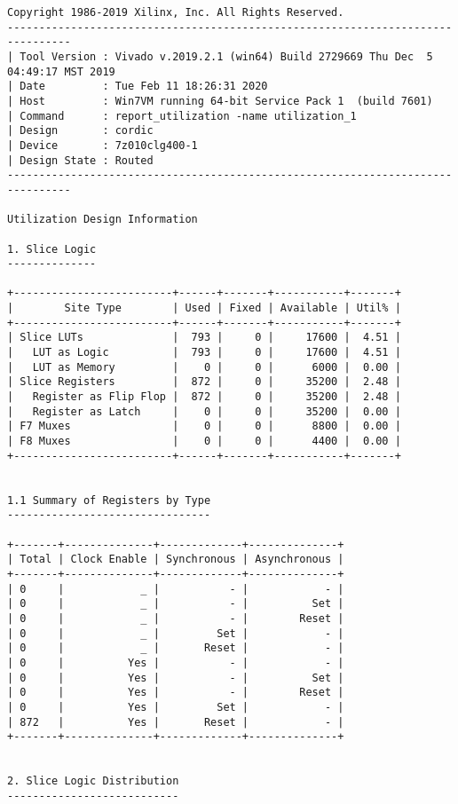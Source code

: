 \begin{Verbatim}[fontsize=\footnotesize,xleftmargin=-1cm]
Copyright 1986-2019 Xilinx, Inc. All Rights Reserved.
--------------------------------------------------------------------------------
| Tool Version : Vivado v.2019.2.1 (win64) Build 2729669 Thu Dec  5 04:49:17 MST 2019
| Date         : Tue Feb 11 18:26:31 2020
| Host         : Win7VM running 64-bit Service Pack 1  (build 7601)
| Command      : report_utilization -name utilization_1
| Design       : cordic
| Device       : 7z010clg400-1
| Design State : Routed
--------------------------------------------------------------------------------

Utilization Design Information

1. Slice Logic
--------------

+-------------------------+------+-------+-----------+-------+
|        Site Type        | Used | Fixed | Available | Util% |
+-------------------------+------+-------+-----------+-------+
| Slice LUTs              |  793 |     0 |     17600 |  4.51 |
|   LUT as Logic          |  793 |     0 |     17600 |  4.51 |
|   LUT as Memory         |    0 |     0 |      6000 |  0.00 |
| Slice Registers         |  872 |     0 |     35200 |  2.48 |
|   Register as Flip Flop |  872 |     0 |     35200 |  2.48 |
|   Register as Latch     |    0 |     0 |     35200 |  0.00 |
| F7 Muxes                |    0 |     0 |      8800 |  0.00 |
| F8 Muxes                |    0 |     0 |      4400 |  0.00 |
+-------------------------+------+-------+-----------+-------+


1.1 Summary of Registers by Type
--------------------------------

+-------+--------------+-------------+--------------+
| Total | Clock Enable | Synchronous | Asynchronous |
+-------+--------------+-------------+--------------+
| 0     |            _ |           - |            - |
| 0     |            _ |           - |          Set |
| 0     |            _ |           - |        Reset |
| 0     |            _ |         Set |            - |
| 0     |            _ |       Reset |            - |
| 0     |          Yes |           - |            - |
| 0     |          Yes |           - |          Set |
| 0     |          Yes |           - |        Reset |
| 0     |          Yes |         Set |            - |
| 872   |          Yes |       Reset |            - |
+-------+--------------+-------------+--------------+


2. Slice Logic Distribution
---------------------------


\end{Verbatim}
